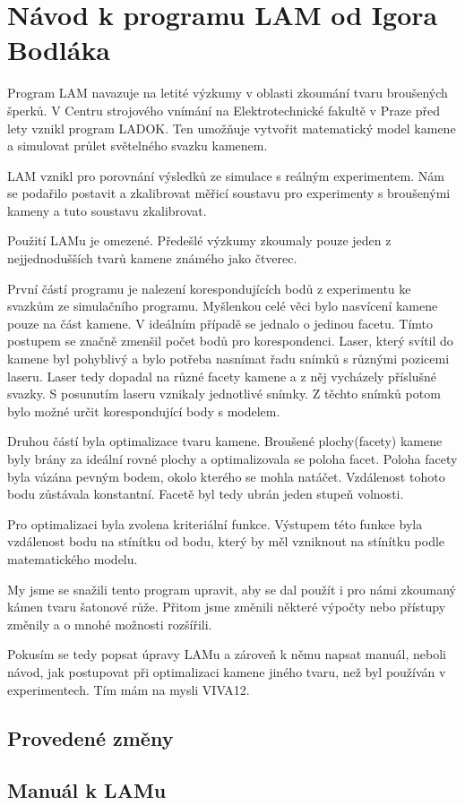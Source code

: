 \chapter{Návod k programu LAM od Igora Bodláka }
	
	Program LAM navazuje na letité výzkumy v oblasti zkoumání tvaru broušených šperků. V Centru strojového vnímání na Elektrotechnické fakultě v Praze před lety vznikl program LADOK. Ten umožňuje vytvořit matematický model kamene a simulovat průlet světelného svazku kamenem. 
	
	LAM vznikl pro porovnání výsledků ze simulace s reálným experimentem. Nám se podařilo postavit a zkalibrovat měřicí soustavu pro experimenty s broušenými kameny a tuto soustavu zkalibrovat. 
	
	Použití LAMu je omezené. Předešlé výzkumy zkoumaly pouze jeden z nejjednodušších tvarů kamene známého jako čtverec. 
	
	První částí programu je nalezení korespondujících bodů z experimentu ke svazkům ze simulačního programu. Myšlenkou celé věci bylo nasvícení kamene pouze na část kamene. V ideálním případě se jednalo o jedinou facetu. Tímto postupem se značně zmenšil počet bodů pro korespondenci. Laser, který svítil do kamene byl pohyblivý a bylo potřeba nasnímat řadu snímků s různými pozicemi laseru. Laser tedy dopadal na různé facety kamene a z něj vycházely příslušné svazky. S posunutím laseru vznikaly jednotlivé snímky. Z těchto snímků potom bylo možné určit korespondující body s modelem. 
	
	Druhou částí byla optimalizace tvaru kamene. Broušené plochy(facety) kamene byly brány za ideální rovné plochy a optimalizovala se poloha facet. Poloha facety byla vázána pevným bodem, okolo kterého se mohla natáčet. Vzdálenost tohoto bodu zůstávala konstantní. Facetě byl tedy ubrán jeden stupeň volnosti. 
	
	Pro optimalizaci byla zvolena kriteriální funkce. Výstupem této funkce byla vzdálenost bodu na stínítku od bodu, který by měl vzniknout na stínítku podle matematického modelu. 
	
	My jsme se snažili tento program upravit, aby se dal použít i pro námi zkoumaný kámen tvaru šatonové růže. Přitom jsme změnili některé výpočty nebo přístupy změnily a o mnohé možnosti rozšířili. 
	
	Pokusím se tedy popsat úpravy LAMu a zároveň k němu napsat manuál, neboli návod, jak postupovat při optimalizaci kamene jiného tvaru, než byl používán v experimentech. Tím mám na mysli VIVA12.
	
\section{Provedené změny}

\section{Manuál k LAMu}


 \clearpage